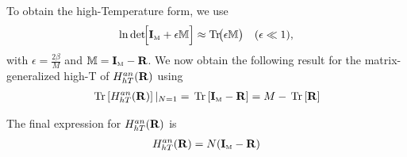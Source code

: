 To obtain the high-Temperature form, we use
\begin{align}
\ln\det\!\Bigl[\mathbf{I}_{\text{\tiny M}} + \epsilon\mathbb{M}\Bigr]
\approx \mathrm{Tr}\!\bigl(\epsilon\mathbb{M}\bigr)
\quad(\epsilon\ll 1),
\end{align}
with $\epsilon=\tfrac{2\beta}{M}$ and $\mathbb{M}=\mathbf{I}_{\text{\tiny M}}-\mathbf{R}$.   
We now obtain the following result for the matrix-generalized high-T of $H^{an}_{hT}(\mathbf{R})$ using
\begin{align}
\label{eqn:GANHTmatRN1}
\mbox{}\operatorname{Tr}\left[H^{an}_{hT}(\mathbf{R})\right]\vert_{N=1} = \mbox{}\operatorname{Tr}\left[\mathbf{I}_{\text{\tiny M}}-\mathbf{R}\right] = M-\mbox{}\operatorname{Tr}\left[\mathbf{R}\right]
\end{align}

The final expression for $H^{an}_{hT}(\mathbf{R})$ is
\begin{align}
\label{eqn:GANHTmatR}
H^{an}_{hT}(\mathbf{R}) = N(\mathbf{I}_{\text{\tiny M}}-\mathbf{R})
\end{align}




